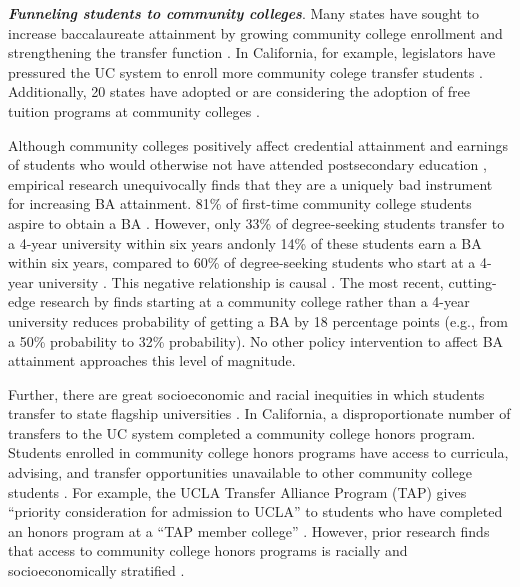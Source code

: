 \documentclass[twoside]{article}
\begin{document}

\textbf{\textit{Funneling students to community colleges}}. Many states have sought to increase baccalaureate attainment by growing community college enrollment and strengthening the transfer function \citep{RN4430,RN4431}. In California, for example, legislators have pressured the UC system to enroll more community colege transfer students \citep{RN4427}. Additionally, 20 states have adopted or are considering the adoption of free tuition programs at community colleges \citep{RN4425,RN4426}.




Although community colleges positively affect credential attainment and earnings of students who would otherwise not have attended postsecondary education \citep[e.g., ][]{RN4404}, empirical research unequivocally finds that they are a uniquely bad instrument for increasing BA attainment. 81\% of first-time community college students aspire to obtain a BA \citep{RN4406}. However, only 33\% of degree-seeking students transfer to a 4-year university within six years \citep{RN4406} andonly 14\% of these students earn a BA within six years, compared to 60\% of degree-seeking students who start at a 4-year university \citep{RN4406}.  This negative relationship is causal \citep[e.g., ][]{RN4284,RN2261,RN4292,RN4405}. The most recent, cutting-edge research by \cite{RN4404} finds starting at a community college rather than a 4-year university reduces probability of getting a BA by 18 percentage points (e.g., from a 50\% probability to 32\% probability).  No other policy intervention to affect BA attainment approaches this level of magnitude.

Further, there are great socioeconomic and racial inequities in which students transfer to state flagship universities \citep{RN1492,RN4406}. In California, a disproportionate number of transfers to the UC system completed a community college honors program. Students enrolled in community college honors programs have access to curricula, advising, and transfer opportunities unavailable to other community college students \citep{RN4444,RN4443}. For example, the UCLA Transfer Alliance Program (TAP) gives ``priority consideration for admission to UCLA'' to students who have completed an honors program at a ``TAP member college'' \citep{RN4432}. However, prior research finds that access to community college honors programs is racially and socioeconomically stratified \citep{RN4440,RN4441,RN4445}.  
\end{document}
